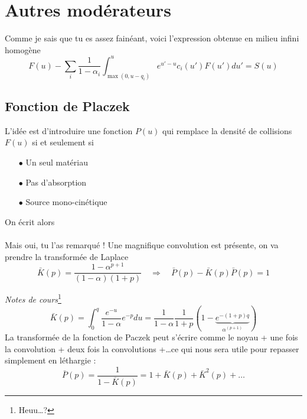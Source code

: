 	
\section{Autres modérateurs}
	Comme je sais que tu es assez fainéant, voici l'expression obtenue en milieu infini homogène
	\begin{equation}
	F(u) - \sum\limits_i  \frac{1}{{1 - {\alpha _i}}}\int_{\max (0,u - {q_i})}^u  {e^{u' - u}}{c_i}
	(u')F(u')du' = S(u)
	\end{equation}
	
	\subsection{Fonction de Placzek}
	L'idée est d'introduire une fonction $P(u)$ qui remplace la densité de collisions $F(u)$ si et
	seulement si
	\begin{itemize}
	\item[$\bullet$] Un seul matériau
	\item[$\bullet$] Pas d'absorption
	\item[$\bullet$] Source mono-cinétique
	\end{itemize}	
	On écrit alors\\
	
	\ \\
	
	
	Mais oui, tu l'as remarqué ! Une magnifique convolution est présente, on va prendre la transformée 
	de Laplace
	\begin{equation}
	\bar K(p) = \frac{{1 - {\alpha ^{p + 1}}}}{{(1 - \alpha )(1 + p)}}\quad\Rightarrow\quad
	\bar P(p) - \bar K(p)\bar P(p) = 1
	\end{equation}	 
	
	\textit{Notes de cours}\footnote{Heuu\dots ?}
	\begin{equation}
	\bar K (p) = \int_0^q \frac{e^{-u}}{1-\alpha}e^{-p}du = \frac{1}{1-\alpha} \frac{1}{1+p}\left(1-\underbrace{e^{-(1+p)q}}_{\alpha^{(p+1)}}\right)
	\end{equation}
	La transformée de la fonction de Paczek peut s'écrire comme le noyau + une fois la convolution 
	+ deux fois la convolutions +\dots ce qui nous sera utile pour repasser simplement en léthargie :
	\begin{equation}
	\bar P(p) = \frac{1}{{1 - \bar K(p)}} = 1 + \bar K(p) + {\bar K^2}(p) + \dots
	\end{equation}
	
